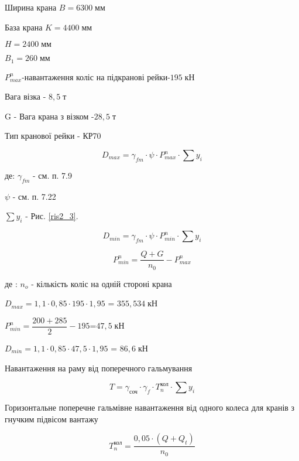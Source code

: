 \documentclass[a4paper,14pt]{article}
\begin{document}
Ширина крана $B=6300\;\textit{мм}$

База крана $K=4400\;\textit{мм}$

$H=2400\;\textit{мм}$

$B_1=260\;\textit{мм}$

$P^n_{max}$-навантаження коліс на підкранові рейки-$195\;\textit{кН}$

Вага візка - $8,5\;\textit{т}$

G - Вага крана з візком -$28,5\;\textit{т}$

Тип кранової рейки - КР70



\begin{equation}
    D_{max}=\gamma_{fm}\cdot \psi \cdot P^n_{max} \cdot \sum y_i
\end{equation}

де: $\gamma_{fm}$ - см. п. 7.9 %

$\psi$ - см. п. 7.22 %

$\sum y_i$ - Рис. \ref{ris2_3}.

\begin{equation}
    D_{min}=\gamma_{fm}\cdot \psi \cdot P^n_{min} \cdot \sum y_i
\end{equation}

\begin{equation}
P^n_{min} = \dfrac {Q+G}{n_0}-P^n_{max}
\end{equation}

де : $n_o$ - кількість коліс на одній стороні крана

$D_{max}=1,1\cdot 0,85 \cdot 195 \cdot 1,95$ = $355,534\;\textit{кН}$

$P^n_{min} = \dfrac {200+285}{2}-195$=$47,5\;\textit{кН}$

$D_{min}=1,1\cdot 0,85 \cdot 47,5 \cdot 1,95$ = $86,6\;\textit{кН}$

Навантаження на раму від поперечного гальмування

\begin{equation}
    T=\gamma_\textit{соч}\cdot \gamma_f \cdot T^\textit{кол}_{n} \cdot \sum y_i
\end{equation}

Горизонтальне поперечне гальмівне навантаження від одного колеса 
   для кранів з гнучким підвісом вантажу 

\begin{equation}
    T^\textit{кол}_{n}=\dfrac {0,05\cdot (Q+Q_t)}{n_0}
\end{equation}
\end{document}
